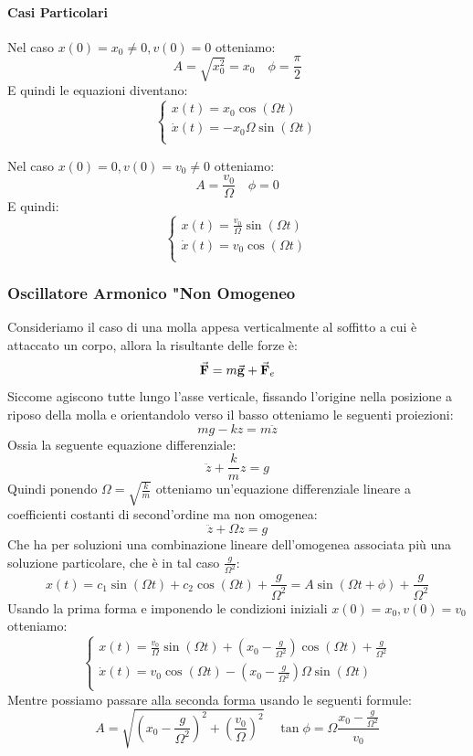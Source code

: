 \documentclass{article}
\newcommand{\g}{\va{g}}
\newcommand{\F}{\va{F}}
\begin{document}
\paragraph{Casi Particolari}

Nel caso $x(0)=x_0\neq0,v(0)=0$ otteniamo:
\[A=\sqrt{x_0^2}=x_0\quad \phi=\frac{\pi}{2}\]
E quindi le equazioni diventano:
\[\left\{\begin{array}{l}
    x(t)=x_0\cos(\Omega t) \\
    \Dot{x}(t)=-x_0\Omega\sin(\Omega t)  \\
\end{array}\right.\]

Nel caso $x(0)=0,v(0)=v_0\neq0$ otteniamo:
\[A=\frac{v_0}{\Omega}\quad\phi=0\]
E quindi:
\[\left\{\begin{array}{l}
    x(t)=\frac{v_0}{\Omega}\sin(\Omega t) \\
    \Dot{x}(t)=v_0\cos(\Omega t)\\
\end{array}\right.\]

\subsubsection{Oscillatore Armonico "Non Omogeneo}
Consideriamo il caso di una molla appesa verticalmente al soffitto a cui è attaccato un corpo, allora la risultante delle forze è:
\[\F=m\g+\F_e\]
Siccome agiscono tutte lungo l'asse verticale, fissando l'origine nella posizione a riposo della molla e orientandolo verso il basso otteniamo le seguenti proiezioni:
\[mg-kz=m\ddot{z}\]
Ossia la seguente equazione differenziale:
\[\ddot{z}+\frac{k}{m}z=g\]
Quindi ponendo $\Omega=\sqrt{\frac{k}{m}}$ otteniamo un'equazione differenziale lineare a coefficienti costanti di second'ordine ma non omogenea:
\[\ddot{z}+\Omega z=g\]
Che ha per soluzioni una combinazione lineare dell'omogenea associata più una soluzione particolare, che è in tal caso $\frac{g}{\Omega^2}$:
\[x(t)=c_1\sin(\Omega t)+c_2\cos(\Omega t)+\frac{g}{\Omega^2}=A\sin(\Omega t+\phi)+\frac{g}{\Omega^2}\]
Usando la prima forma e imponendo le condizioni iniziali $x(0)=x_0,v(0)=v_0$ otteniamo:
\[\left\{\begin{array}{l}
    x(t)=\frac{v_0}{\Omega}\sin(\Omega t)+\left(x_0-\frac{g}{\Omega^2}\right)\cos(\Omega t)+\frac{g}{\Omega^2} \\
    \Dot{x}(t)=v_0\cos(\Omega t)-\left(x_0-\frac{g}{\Omega^2}\right)\Omega\sin(\Omega t)  \\
\end{array}\right.\]
Mentre possiamo passare alla seconda forma usando le seguenti formule:
\[A=\sqrt{\left(x_0-\frac{g}{\Omega^2}\right)^2+\left(\frac{v_0}{\Omega}\right)^2}\quad\tan\phi=\Omega\frac{x_0-\frac{g}{\Omega^2}}{v_0}\]
\end{document}
